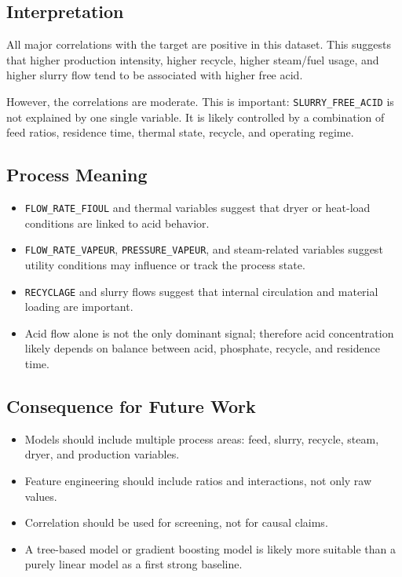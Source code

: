 \documentclass[11pt,a4paper]{article}
\begin{document}
\subsection{Interpretation}

All major correlations with the target are positive in this dataset. This suggests that higher production intensity, higher recycle, higher steam/fuel usage, and higher slurry flow tend to be associated with higher free acid.

However, the correlations are moderate. This is important: \texttt{SLURRY\_FREE\_ACID} is not explained by one single variable. It is likely controlled by a combination of feed ratios, residence time, thermal state, recycle, and operating regime.

\subsection{Process Meaning}

\begin{itemize}
    \item \texttt{FLOW\_RATE\_FIOUL} and thermal variables suggest that dryer or heat-load conditions are linked to acid behavior.
    \item \texttt{FLOW\_RATE\_VAPEUR}, \texttt{PRESSURE\_VAPEUR}, and steam-related variables suggest utility conditions may influence or track the process state.
    \item \texttt{RECYCLAGE} and slurry flows suggest that internal circulation and material loading are important.
    \item Acid flow alone is not the only dominant signal; therefore acid concentration likely depends on balance between acid, phosphate, recycle, and residence time.
\end{itemize}

\subsection{Consequence for Future Work}

\begin{itemize}
    \item Models should include multiple process areas: feed, slurry, recycle, steam, dryer, and production variables.
    \item Feature engineering should include ratios and interactions, not only raw values.
    \item Correlation should be used for screening, not for causal claims.
    \item A tree-based model or gradient boosting model is likely more suitable than a purely linear model as a first strong baseline.
\end{itemize}
\end{document}
